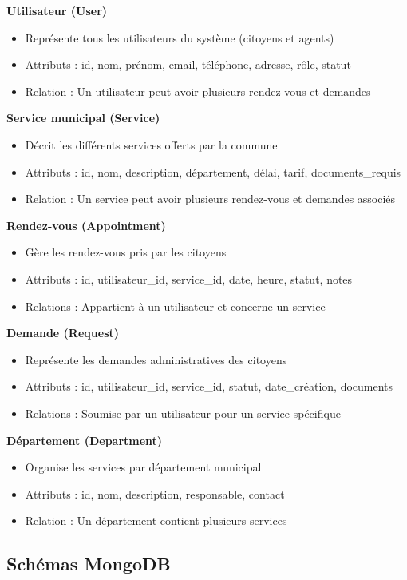 \textbf{Utilisateur (User)}
\begin{itemize}
\item Représente tous les utilisateurs du système (citoyens et agents)
\item Attributs : id, nom, prénom, email, téléphone, adresse, rôle, statut
\item Relation : Un utilisateur peut avoir plusieurs rendez-vous et demandes
\end{itemize}

\textbf{Service municipal (Service)}
\begin{itemize}
\item Décrit les différents services offerts par la commune
\item Attributs : id, nom, description, département, délai, tarif, documents\_requis
\item Relation : Un service peut avoir plusieurs rendez-vous et demandes associés
\end{itemize}

\textbf{Rendez-vous (Appointment)}
\begin{itemize}
\item Gère les rendez-vous pris par les citoyens
\item Attributs : id, utilisateur\_id, service\_id, date, heure, statut, notes
\item Relations : Appartient à un utilisateur et concerne un service
\end{itemize}

\textbf{Demande (Request)}
\begin{itemize}
\item Représente les demandes administratives des citoyens
\item Attributs : id, utilisateur\_id, service\_id, statut, date\_création, documents
\item Relations : Soumise par un utilisateur pour un service spécifique
\end{itemize}

\textbf{Département (Department)}
\begin{itemize}
\item Organise les services par département municipal
\item Attributs : id, nom, description, responsable, contact
\item Relation : Un département contient plusieurs services
\end{itemize}

\subsection{Schémas MongoDB}

